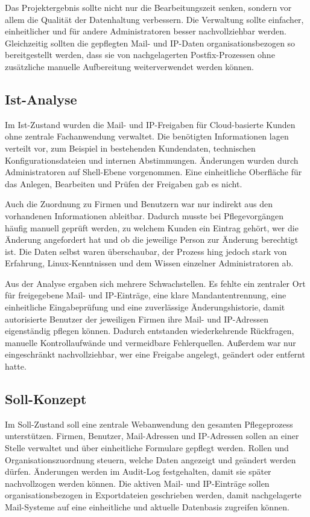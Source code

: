 Das Projektergebnis sollte nicht nur die Bearbeitungszeit senken, sondern vor
allem die Qualität der Datenhaltung verbessern. Die Verwaltung sollte einfacher,
einheitlicher und für andere Administratoren besser nachvollziehbar werden.
Gleichzeitig sollten die gepflegten Mail- und IP-Daten organisationsbezogen so
bereitgestellt werden, dass sie von nachgelagerten Postfix-Prozessen ohne
zusätzliche manuelle Aufbereitung weiterverwendet werden können.

\subsection{Ist-Analyse}
\label{sec:IstAnalyse}
Im Ist-Zustand wurden die Mail- und IP-Freigaben für Cloud-basierte Kunden ohne
zentrale Fachanwendung verwaltet. Die benötigten Informationen lagen verteilt
vor, zum Beispiel in bestehenden Kundendaten, technischen Konfigurationsdateien
und internen Abstimmungen. Änderungen wurden durch Administratoren auf
Shell-Ebene vorgenommen. Eine einheitliche Oberfläche für das Anlegen,
Bearbeiten und Prüfen der Freigaben gab es nicht.

Auch die Zuordnung zu Firmen und Benutzern war nur indirekt aus den
vorhandenen Informationen ableitbar. Dadurch musste bei Pflegevorgängen häufig
manuell geprüft werden, zu welchem Kunden ein Eintrag gehört, wer die Änderung
angefordert hat und ob die jeweilige Person zur Änderung berechtigt ist. Die
Daten selbst waren überschaubar, der Prozess hing jedoch stark von
Erfahrung, Linux-Kenntnissen und dem Wissen einzelner Administratoren ab.

Aus der Analyse ergaben sich mehrere Schwachstellen. Es fehlte ein zentraler
Ort für freigegebene Mail- und IP-Einträge, eine klare Mandantentrennung, eine
einheitliche Eingabeprüfung und eine zuverlässige Änderungshistorie, damit autorisierte Benutzer der jeweiligen Firmen ihre
Mail- und IP-Adressen eigenständig pflegen können. Dadurch
entstanden wiederkehrende Rückfragen, manuelle Kontrollaufwände und vermeidbare
Fehlerquellen. Außerdem war nur eingeschränkt nachvollziehbar, wer eine
Freigabe angelegt, geändert oder entfernt hatte.

\subsection{Soll-Konzept}
\label{sec:SollKonzept}
Im Soll-Zustand soll eine zentrale Webanwendung den gesamten Pflegeprozess
unterstützen. Firmen, Benutzer, Mail-Adressen und IP-Adressen sollen
an einer Stelle verwaltet und über einheitliche Formulare gepflegt werden.
Rollen und Organisationszuordnung steuern, welche Daten angezeigt und geändert
werden dürfen. Änderungen werden im Audit-Log festgehalten, damit sie
später nachvollzogen werden können. Die aktiven Mail- und
IP-Einträge sollen organisationsbezogen in Exportdateien geschrieben werden, damit
nachgelagerte Mail-Systeme auf eine einheitliche und aktuelle Datenbasis
zugreifen können.

